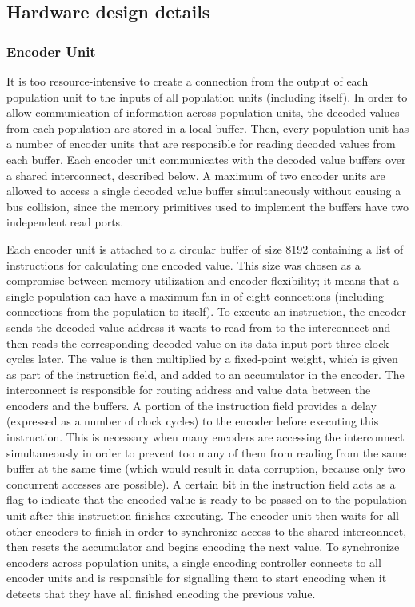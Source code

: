 \documentclass[english]{article}
\begin{document}
\subsection{Hardware design details}

\subsubsection{Encoder Unit}

It is too resource-intensive to create a connection from the output of each population unit to the inputs of all population units (including itself).
In order to allow communication of information across population units, the decoded values from each population are stored in a local buffer.
Then, every population unit has a number of encoder units that are responsible for reading decoded values from each buffer. 
Each encoder unit communicates with the decoded value buffers over a shared interconnect, described below.
A maximum of two encoder units are allowed to access a single decoded value buffer simultaneously
without causing a bus collision, since the memory primitives used to implement the buffers have two independent read ports.

Each encoder unit is attached to a circular buffer of size 8192
containing a list of instructions for calculating one encoded value. 
This size was chosen as a compromise between memory utilization and encoder flexibility;
it means that a single population can have a maximum fan-in of eight connections (including connections from the population to itself).
To execute an instruction, the encoder sends the decoded value address it wants to read from to the interconnect
and then reads the corresponding decoded value on its data input port three clock cycles later.
The value is then multiplied by a fixed-point weight, which is given as part of the instruction field, and added to an accumulator in the encoder.
The interconnect is responsible for routing address and value data between the encoders and the buffers.
A portion of the instruction field provides a delay (expressed as a number of clock cycles) to the encoder before executing this instruction.
This is necessary when many encoders are accessing the interconnect simultaneously in order to prevent too many of them from reading
from the same buffer at the same time (which would result in data corruption, because only two concurrent accesses are possible).
A certain bit in the instruction field acts as a flag to indicate that the encoded value is ready to be passed on to the population unit after this
instruction finishes executing. The encoder unit then waits for all other encoders to finish in order to synchronize
access to the shared interconnect, then resets the accumulator and begins encoding the next value.
To synchronize encoders across population units, a single encoding controller connects to all encoder units and is responsible for
signalling them to start encoding when it detects that they have all finished encoding the previous value.
\end{document}
